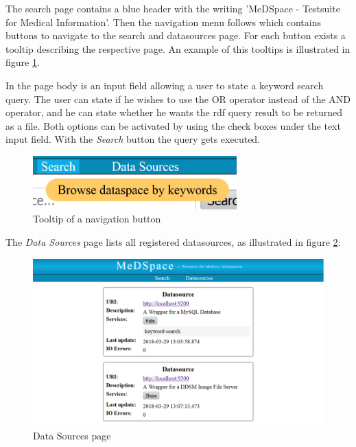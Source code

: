 The search page contains a blue header with the writing 'MeDSpace - Testsuite for Medical Information'. Then the navigation menu follows which contains buttons to navigate to the search and datasources page. For each button exists a tooltip describing the respective page. An example of this tooltips is illustrated in figure \ref{MeDSpaceDataTooltip}. 

In the page body is an input field allowing a user to state a keyword search query. The user can state if he wishes to use the OR operator instead of the AND operator, and he can state whether he wants the rdf query result to be returned as a file. Both options can be activated by using the check boxes under the text input field. With the \emph{Search} button the query gets executed.

\begin{figure}[H]
	\begin{center}
		\includegraphics[width=0.7\textwidth]{figures/MeDSpace-GUI-Tooltip.png}
	\end{center}
	\caption{Tooltip of a navigation button}
	\label{MeDSpaceDataTooltip}
\end{figure}


The \emph{Data Sources} page lists all registered datasources, as illustrated in figure \ref{MeDSpaceDataSourcePage}: 

\begin{figure}[H]
	\begin{center}
		\includegraphics[width=1\textwidth]{figures/MeDSpace-GUI-Datasources.png}
	\end{center}
	\caption{Data Sources page}
	\label{MeDSpaceDataSourcePage}
\end{figure}

